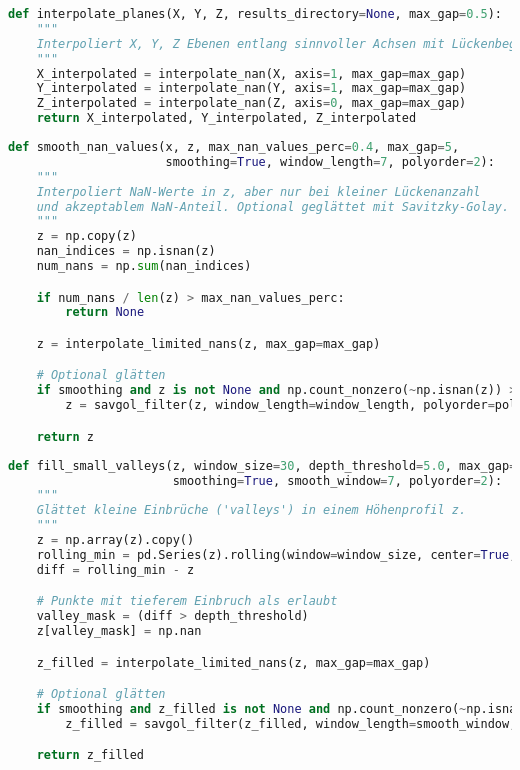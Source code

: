 \begin{lstlisting}[language=Python, caption={Interpolation von X-, Y- und Z-Ebenen}, label={lst:interp-planes}]
def interpolate_planes(X, Y, Z, results_directory=None, max_gap=0.5):
    """
    Interpoliert X, Y, Z Ebenen entlang sinnvoller Achsen mit Lückenbegrenzung.
    """
    X_interpolated = interpolate_nan(X, axis=1, max_gap=max_gap)
    Y_interpolated = interpolate_nan(Y, axis=1, max_gap=max_gap)
    Z_interpolated = interpolate_nan(Z, axis=0, max_gap=max_gap)
    return X_interpolated, Y_interpolated, Z_interpolated
\end{lstlisting}

\begin{lstlisting}[language=Python, caption={Kapselnde 1D-Pipeline: begrenzte Interpolation mit optionaler Glättung}, label={lst:smooth-nan-values}]
def smooth_nan_values(x, z, max_nan_values_perc=0.4, max_gap=5, 
                      smoothing=True, window_length=7, polyorder=2):
    """
    Interpoliert NaN-Werte in z, aber nur bei kleiner Lückenanzahl
    und akzeptablem NaN-Anteil. Optional geglättet mit Savitzky-Golay.
    """
    z = np.copy(z)
    nan_indices = np.isnan(z)
    num_nans = np.sum(nan_indices)

    if num_nans / len(z) > max_nan_values_perc:
        return None

    z = interpolate_limited_nans(z, max_gap=max_gap)

    # Optional glätten
    if smoothing and z is not None and np.count_nonzero(~np.isnan(z)) > window_length:
        z = savgol_filter(z, window_length=window_length, polyorder=polyorder)

    return z
\end{lstlisting}

\begin{lstlisting}[language=Python, caption={Schließen kurzer Täler (Valleys) via begrenzter Interpolation}, label={lst:fill-small-valleys}]
def fill_small_valleys(z, window_size=30, depth_threshold=5.0, max_gap=0.5,
                       smoothing=True, smooth_window=7, polyorder=2):
    """
    Glättet kleine Einbrüche ('valleys') in einem Höhenprofil z.
    """
    z = np.array(z).copy()
    rolling_min = pd.Series(z).rolling(window=window_size, center=True, min_periods=5).min()
    diff = rolling_min - z

    # Punkte mit tieferem Einbruch als erlaubt
    valley_mask = (diff > depth_threshold)
    z[valley_mask] = np.nan

    z_filled = interpolate_limited_nans(z, max_gap=max_gap)

    # Optional glätten
    if smoothing and z_filled is not None and np.count_nonzero(~np.isnan(z_filled)) > smooth_window:
        z_filled = savgol_filter(z_filled, window_length=smooth_window, polyorder=2)

    return z_filled
\end{lstlisting}
